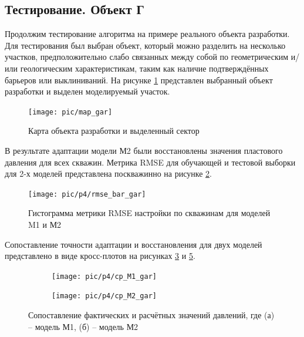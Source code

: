 \documentclass[14pt]{article}
\begin{document}
\subsection{Тестирование. Объект Г}
Продолжим тестирование алгоритма на примере реального объекта разработки.
Для тестирования был выбран объект, который можно разделить на несколько участков, предположительно слабо связанных между собой по геометрическим и/или геологическим характеристикам, таким как наличие подтверждённых барьеров или выклиниваний.
На рисунке \ref{fig:mapgar} представлен выбранный объект разработки и выделен моделируемый участок.
\begin{figure}
	\centering
	\texttt{[image: pic/map\_gar]}
	\label{fig:mapgar}
	\caption{Карта объекта разработки и выделенный сектор}
\end{figure}

В результате адаптации модели М2 были восстановлены значения пластового давления для всех скважин. Метрика RMSE для обучающей и тестовой выборки для 2-х моделей представлена поскважинно на рисунке \ref{fig:bar_mape_gar_s1s2}.
\begin{figure}
	\centering
	\texttt{[image: pic/p4/rmse\_bar\_gar]}
	\caption{Гистограмма метрики RMSE настройки по скважинам для моделей M1 и М2}
	\label{fig:bar_mape_gar_s1s2}
\end{figure}
Сопоставление точности адаптации и восстановления для двух моделей представлено в виде кросс-плотов на рисунках \ref{fig:gar_s1_cp_m1} и \ref{fig:gar_s1_cp_m2}.

\begin{figure}[!htb]
	\begin{subfigure}[b]{0.45\linewidth}
		\texttt{[image: pic/p4/cp\_M1\_gar]}
		\caption{}
		\label{fig:gar_s1_cp_m1}
	\end{subfigure}
	\begin{subfigure}[b]{0.45\linewidth}
		\texttt{[image: pic/p4/cp\_M2\_gar]}
		\caption{}
		\label{fig:gar_s1_cp_m2}
	\end{subfigure}
	\caption{Сопоставление фактических и расчётных значений давлений, где (а) -- модель М1, (б) -- модель М2}
\end{figure}
\end{document}
